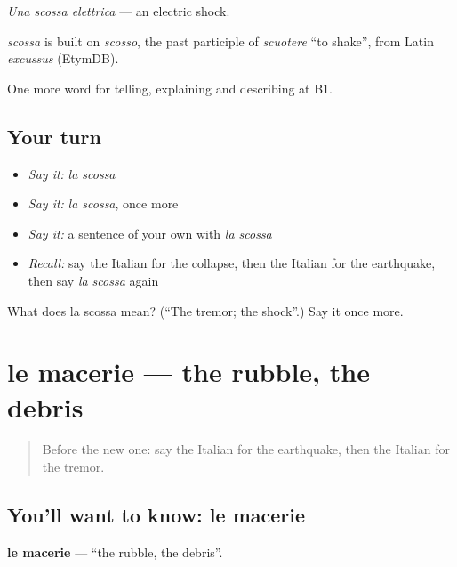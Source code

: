 \emph{Una scossa elettrica} — an electric shock.

\begin{cousinweb}
\emph{scossa} is built on \emph{scosso}, the past participle of \emph{scuotere} \textquotedblleft{}to shake\textquotedblright{}, from Latin \emph{excussus} (EtymDB).
\end{cousinweb}

\begin{grammarlens}[title={What you've built}]
One more word for telling, explaining and describing at B1.
\end{grammarlens}

\subsection*{Your turn}
\begin{itemize}
\raggedright
  \item \emph{Say it:} \emph{la scossa}
  \item \emph{Say it:} \emph{la scossa}, once more
  \item \emph{Say it:} a sentence of your own with \emph{la scossa}
  \item \emph{Recall:} say the Italian for the collapse, then the Italian for the earthquake, then say \emph{la scossa} again
\end{itemize}

\begin{tcolorbox}[breakable,colback=teal!4,colframe=teal!35!black,title={Before you move on}]
What does la scossa mean? (\textquotedblleft{}The tremor; the shock\textquotedblright{}.) Say it once more.
\end{tcolorbox}
\section[le macerie]{le macerie — the rubble, the debris}

\label{lesson:IT-C304-macerie}



\begin{quote}
Before the new one: say the Italian for the earthquake, then the Italian for the tremor.
\end{quote}

\subsection*{You'll want to know: le macerie}
\textbf{le macerie} — \textquotedblleft{}the rubble, the debris\textquotedblright{}.

